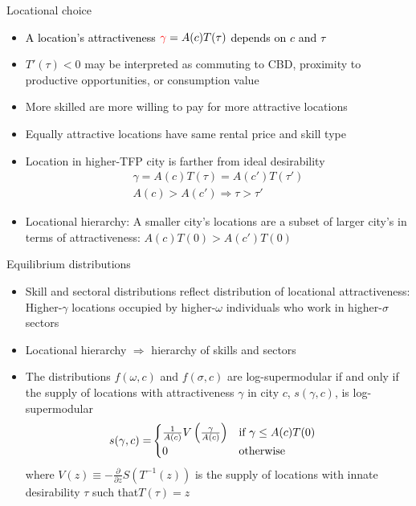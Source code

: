 \documentclass[10pt,notes=hide]{beamer}
\begin{document}
\begin{frame}{Locational choice}
\begin{itemize}
\item \textcolor{black}{A location's attractiveness ${\color{red}\gamma}=A(c)T(\tau)$
depends on $c$ and $\tau$}
\item $T'(\tau)<0$ may be interpreted as commuting to CBD, proximity to
productive opportunities, or consumption value
\item More skilled are more willing to pay for more attractive locations
\item Equally attractive locations have same rental price and skill type
\item Location in higher-TFP city is farther from ideal desirability
\begin{align*}
\gamma=A(c)T(\tau)=A(c')T(\tau')\\
A(c)>A(c')\Rightarrow\tau>\tau'
\end{align*}

\item Locational hierarchy: A smaller city's locations are a subset of larger
city's in terms of attractiveness: $A(c)T(0)>A(c')T(0)$ 
\end{itemize}

\end{frame}


\begin{frame}{Equilibrium distributions}
\begin{itemize}
\item Skill and sectoral distributions reflect distribution of locational
attractiveness: Higher-$\gamma$ locations occupied by higher-$\omega$
individuals who work in higher-$\sigma$ sectors
\item Locational hierarchy $\Rightarrow$ hierarchy of skills and sectors
\item The distributions $f(\omega,c)$ and $f(\sigma,c)$ are log-supermodular
if and only if the supply of locations with attractiveness $\gamma$
in city $c$, $s(\gamma,c)$, is log-supermodular 
\begin{align*}
s(\gamma,c)= & \begin{cases}
\frac{1}{A(c)}V\left(\frac{\gamma}{A(c)}\right) & \textnormal{if }\gamma\leq A(c)T(0)\\
0 & \textnormal{otherwise}
\end{cases}
\end{align*}
where\textrm{ $V(z)\equiv-\frac{\partial}{\partial z}S\left(T^{-1}(z)\right)$
is }the supply of locations with innate desirability $\tau$ such
that$T(\tau)=z$
\end{itemize}

\end{frame}
\end{document}
